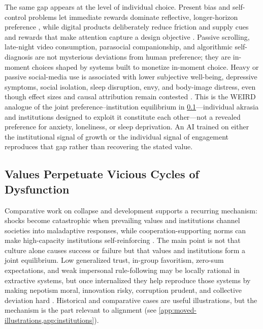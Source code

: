 \documentclass{article}
\theoremstyle{plain}
\theoremstyle{definition}
\theoremstyle{remark}
\begin{document}
The same gap appears at the level of individual choice. Present bias and self-control problems let immediate rewards dominate reflective, longer-horizon preference \citep{odonoghue1999doing, frederick2002time}, while digital products deliberately reduce friction and supply cues and rewards that make attention capture a design objective \citep{fogg2003persuasive}. Passive scrolling, late-night video consumption, parasocial companionship, and algorithmic self-diagnosis \citep{yeung2022tiktok, turuba2025tiktok} are not mysterious deviations from human preference; they are in-moment choices shaped by systems built to monetize in-moment choice. Heavy or passive social-media use is associated with lower subjective well-being, depressive symptoms, social isolation, sleep disruption, envy, and body-image distress, even though effect sizes and causal attribution remain contested \citep{kross2013facebook, verduyn2015passive, primack2017social, kelly2018social, orben2019association}. This is the WEIRD analogue of the joint preference--institution equilibrium in \cref{subsec:values-perpetuate-vicious-cycles}---individual akrasia and institutions designed to exploit it constitute each other---not a revealed preference for anxiety, loneliness, or sleep deprivation. An AI trained on either the institutional signal of growth or the individual signal of engagement reproduces that gap rather than recovering the stated value.

\subsection{Values Perpetuate Vicious Cycles of Dysfunction}
\label{subsec:values-perpetuate-vicious-cycles}
Comparative work on collapse and development supports a recurring mechanism: shocks become catastrophic when prevailing values and institutions channel societies into maladaptive responses, while cooperation-supporting norms can make high-capacity institutions self-reinforcing \citep{diamond2011collapse, hoyer2023polycrisis, guiso2016long, tabellini2008institutions, alesina2015culture}. The main point is not that culture alone causes success or failure but that values and institutions form a joint equilibrium. Low generalized trust, in-group favoritism, zero-sum expectations, and weak impersonal rule-following may be locally rational in extractive systems, but once internalized they help reproduce those systems by making nepotism moral, innovation risky, corruption prudent, and collective deviation hard \citep{greif2006institutions, bisin2001economics, northwallisweingast2009}. Historical and comparative cases are useful illustrations, but the mechanism is the part relevant to alignment (see \cref{app:moved-illustrations,app:institutions}).
\end{document}
